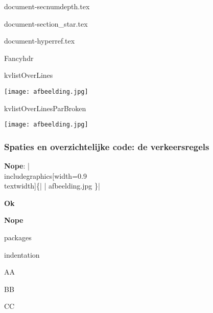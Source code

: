 \documentclass{cursuspresentatie}
\def\importslide#1#2{%
	{#2}
}
\begin{document}
\importslide{document}{document-secnumdepth.tex}

\importslide{document}{document-section_star.tex}

\importslide{document}{document-hyperref.tex}


\begin{frame}
	Fancyhdr
\end{frame}


\begin{saveblock}{kvlistOverLines}
	\begin{highlightblock}
		\texttt{[image: afbeelding.jpg]}
	\end{highlightblock}
\end{saveblock}

\begin{saveblock}{kvlistOverLinesParBroken}
	\begin{highlightblock}
		\texttt{[image: afbeelding.jpg]}
	\end{highlightblock}
\end{saveblock}

\begin{frame}
	\frametitle{Spaties en overzichtelijke code: de verkeersregels}

	\textbf{\textcolor{darkpastelred}{Nope}}: \hll|\\includegraphics[width=0.9\\textwidth]\{| \hll| afbeelding.jpg \}|
	\medskip

	\textbf{\textcolor{darkpastelgreen}{Ok}}
	\medskip

	\textbf{\textcolor{darkpastelred}{Nope}}
\end{frame}

\begin{saveblock}{packages}
	\begin{highlightblock}
		\usepackage{
			parskip,
			hyperref
		}
	\end{highlightblock}
\end{saveblock}

\begin{saveblock}{indentation}
	\begin{highlightblock}
		\begin{center}
			AA
		\end{center}
		\begin{center}
		BB
		\end{center}
		\begin{center}CC\end{center}
	\end{highlightblock}
\end{saveblock}
\end{document}
